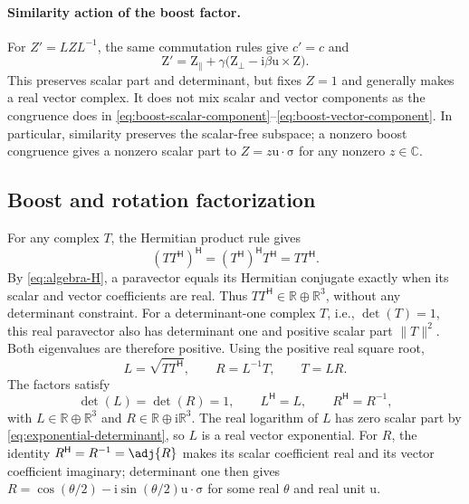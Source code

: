 \documentclass[11pt]{article}
\newcommand{\pv}[1]{{#1}}
\newcommand{\vstyle}[1]{{\bm{\mathrm{#1}}}}
\newcommand{\pL}{\pv{L}}
\newcommand{\pR}{\pv{R}}
\newcommand{\pT}{\pv{T}}
\newcommand{\pZ}{\pv{Z}}
\numberwithin{equation}{section}
\newcommand{\R}{\mathbb{R}}
\newcommand{\C}{\mathbb{C}}
\newcommand{\ii}{\mathrm{i}}
\newcommand{\dotprod}{\cdot}
\newcommand{\bsig}{\vstyle{\sigma}}
\newcommand{\bZ}{\vstyle{Z}}
\newcommand{\bu}{\vstyle{u}}
\begin{document}
\paragraph{Similarity action of the boost factor.}
For $\pZ'=\pL \pZ \pL^{-1}$, the same commutation rules give $c'=c$ and
\begin{equation}
 \bZ'=\bZ_{\parallel}
 +\gamma\bigl(\bZ_{\perp}-\ii\beta\bu\times\bZ\bigr).
 \label{eq:boost-similarity-vector}
\end{equation}
This preserves scalar part and determinant, but fixes $\pZ=1$ and generally
makes a real vector complex.  It does not mix scalar and vector components
as the congruence does in
\eqref{eq:boost-scalar-component}--\eqref{eq:boost-vector-component}.
In particular, similarity preserves the scalar-free subspace;
a nonzero boost congruence gives a nonzero scalar part to
$\pZ=z\bu\dotprod\bsig$ for any nonzero $z\in\C$.

\subsection{Boost and rotation factorization}
\label{sec:boost-rotation-factorization}
For any complex $\pT$, the Hermitian product rule gives
\[
 (\pT\pT^{\mathsf H})^{\mathsf H}
 =(\pT^{\mathsf H})^{\mathsf H}\pT^{\mathsf H}
 =\pT\pT^{\mathsf H}.
\]
By \eqref{eq:algebra-H}, a paravector equals its Hermitian conjugate
exactly when its scalar and vector coefficients are real. Thus
$\pT\pT^{\mathsf H}\in\R\oplus\R^3$, without any determinant constraint.
For a determinant-one complex $\pT$, i.e., $\det(\pT)=1$,
this real paravector also has determinant one and positive scalar part
$\lVert\pT\rVert^2$. Both eigenvalues are therefore positive.
Using the positive real square root,
\[
 \pL=\sqrt{\pT\pT^{\mathsf H}},\qquad
 \pR=\pL^{-1}\pT,\qquad \pT=\pL\pR.
\]
The factors satisfy
\[
 \det(\pL)=\det(\pR)=1,\qquad
 \pL^{\mathsf H}=\pL,\qquad
 \pR^{\mathsf H}=\pR^{-1},
\]
with $\pL\in\R\oplus\R^3$ and $\pR\in\R\oplus\ii\R^3$.
The real logarithm of $\pL$ has zero scalar part by
\eqref{eq:exponential-determinant}, so $\pL$ is a real vector exponential.
For $\pR$, the identity $\pR^{\mathsf H}=\pR^{-1}=\adj {\pR}$ makes its scalar
coefficient real and its vector coefficient imaginary; determinant one
then gives $\pR=\cos(\theta/2)-\ii\sin(\theta/2)\bu\dotprod\bsig$
for some real $\theta$ and real unit $\bu$.
\end{document}
